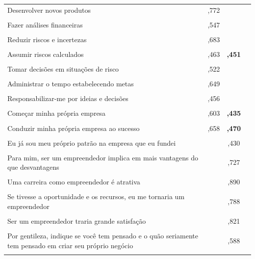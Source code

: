 \begin{longtable}[!h]{p{6cm} c c c }
Desenvolver novos produtos
 &  ,772 & & \\\\
 
Fazer análises financeiras
 &  ,547 & & \\\\
 
Reduzir riscos e incertezas
 &  ,683 &  & \\\\
 
Assumir riscos calculados
 &   ,463 & \textbf{,451} & \\\\
 
Tomar decisões em situações de risco
 &   ,522 & & \\\\
 
Administrar o tempo estabelecendo metas
 &   ,649 & & \\\\
 
Responsabilizar-me por ideias e decisões
 & ,456 & &  \\\\
 
Começar minha própria empresa
& ,603 & \textbf{,435}  & \\\\

Conduzir minha própria empresa ao sucesso
 & ,658 & \textbf{,470}  & \\\\
Eu já sou meu próprio patrão na empresa que eu fundei
 & & ,430 &  \\\\

Para mim, ser um empreendedor implica em mais vantagens do que desvantagens
 &  & ,727  & \\\\
 
Uma carreira como empreendedor é atrativa
 &  & ,890  & \\\\
 
Se tivesse a oportunidade e os recursos, eu me tornaria um empreendedor
 &  & ,788 & \\\\
 
Ser um empreendedor traria grande satisfação
 &  & ,821 & \\\\
 
Por gentileza, indique se você tem pensado e o quão seriamente tem pensado em criar seu próprio negócio
 &  & ,588 & \\\\
 

\end{longtable}
